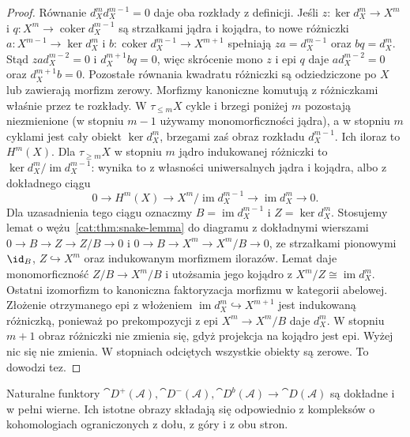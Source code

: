 \begin{proof}
Równanie $d_X^md_X^{m-1}=0$ daje oba rozkłady z definicji. Jeśli $z:\ker d_X^m\to X^m$ i $q:X^m\to\operatorname{coker}d_X^{m-1}$ są strzałkami jądra i kojądra, to nowe różniczki $a:X^{m-1}\to\ker d_X^m$ i $b:\operatorname{coker}d_X^{m-1}\to X^{m+1}$ spełniają $za=d_X^{m-1}$ oraz $bq=d_X^m$. Stąd $zad_X^{m-2}=0$ i $d_X^{m+1}bq=0$, więc skrócenie mono $z$ i epi $q$ daje $ad_X^{m-2}=0$ oraz $d_X^{m+1}b=0$. Pozostałe równania kwadratu różniczki są odziedziczone po $X$ lub zawierają morfizm zerowy. Morfizmy kanoniczne komutują z różniczkami właśnie przez te rozkłady. W $\tau_{\le m}X$ cykle i brzegi poniżej $m$ pozostają niezmienione (w stopniu $m-1$ używamy monomorficzności jądra), a w stopniu $m$ cyklami jest cały obiekt $\ker d_X^m$, brzegami zaś obraz rozkładu $d_X^{m-1}$. Ich iloraz to $H^m(X)$. Dla $\tau_{\ge m}X$ w stopniu $m$ jądro indukowanej różniczki to $\ker d_X^m/\operatorname{im}d_X^{m-1}$: wynika to z własności uniwersalnych jądra i kojądra, albo z dokładnego ciągu
\[
 0\to H^m(X)\to X^m/\operatorname{im}d_X^{m-1}
 \to\operatorname{im}d_X^m\to0.
\]
Dla uzasadnienia tego ciągu oznaczmy $B=\operatorname{im}d_X^{m-1}$ i $Z=\ker d_X^m$. Stosujemy lemat o wężu~\ref{cat:thm:snake-lemma} do diagramu z dokładnymi wierszami $0\to B\to Z\to Z/B\to0$ i $0\to B\to X^m\to X^m/B\to0$, ze strzałkami pionowymi $\id_B$, $Z\hookrightarrow X^m$ oraz indukowanym morfizmem ilorazów. Lemat daje monomorficzność $Z/B\to X^m/B$ i utożsamia jego kojądro z $X^m/Z\cong\operatorname{im}d_X^m$. Ostatni izomorfizm to kanoniczna faktoryzacja morfizmu w kategorii abelowej. Złożenie otrzymanego epi z włożeniem $\operatorname{im}d_X^m\hookrightarrow X^{m+1}$ jest indukowaną różniczką, ponieważ po prekompozycji z epi $X^m\to X^m/B$ daje $d_X^m$. W stopniu $m+1$ obraz różniczki nie zmienia się, gdyż projekcja na kojądro jest epi. Wyżej nic się nie zmienia. W stopniach odciętych wszystkie obiekty są zerowe. To dowodzi tez.
\end{proof}
\begin{twierdzenie}\label{cat:thm:bounded-derived-embedding}
Naturalne funktory $\cat D^+(\mathcal A),\cat D^-(\mathcal A),\cat D^b(\mathcal A)\to\cat D(\mathcal A)$ są dokładne i w pełni wierne. Ich istotne obrazy składają się odpowiednio z kompleksów o kohomologiach ograniczonych z dołu, z góry i z obu stron.
\end{twierdzenie}
